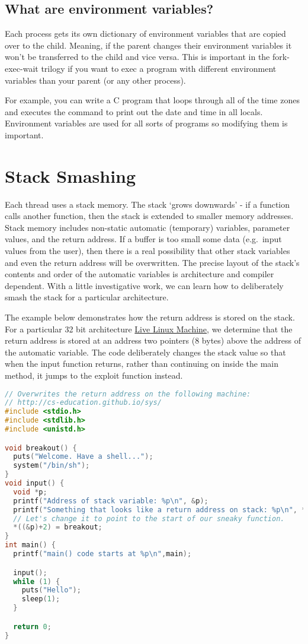 \subsection{What are environment variables?}

Each process gets its own dictionary of environment variables that are copied over to the child. Meaning, if the parent changes their environment variables it won't be transferred to the child and vice versa. This is important in the fork-exec-wait trilogy if you want to exec a program with different environment variables than your parent (or any other process).

For example, you can write a C program that loops through all of the time zones and executes the  command to print out the date and time in all locals. Environment variables are used for all sorts of programs so modifying them is important.

\section{Stack Smashing}

Each thread uses a stack memory.
The stack `grows downwards' - if a function calls another function, then the stack is extended to smaller memory addresses.
Stack memory includes non-static automatic (temporary) variables, parameter values, and the return address.
If a buffer is too small some data (e.g.~input values from the user), then there is a real possibility that other stack variables and even the return address will be overwritten.
The precise layout of the stack's contents and order of the automatic variables is architecture and compiler dependent. With a little investigative work, we can learn how to deliberately smash the stack for a particular architecture.

The example below demonstrates how the return address is stored on the stack.
For a particular 32 bit architecture \href{http://cs-education.github.io/sys/}{Live Linux Machine}, we determine that the return address is stored at an address two pointers (8 bytes) above the address of the automatic variable.
The code deliberately changes the stack value so that when the input function returns, rather than continuing on inside the main method, it jumps to the exploit function instead.

\begin{lstlisting}[language=C]
// Overwrites the return address on the following machine:
// http://cs-education.github.io/sys/
#include <stdio.h>
#include <stdlib.h>
#include <unistd.h>

void breakout() {
  puts("Welcome. Have a shell...");
  system("/bin/sh");
}
void input() {
  void *p;
  printf("Address of stack variable: %p\n", &p);
  printf("Something that looks like a return address on stack: %p\n", *((&p)+2));
  // Let's change it to point to the start of our sneaky function.
  *((&p)+2) = breakout;
}
int main() {
  printf("main() code starts at %p\n",main);

  input();
  while (1) {
    puts("Hello");
    sleep(1);
  }

  return 0;
}
\end{lstlisting}

